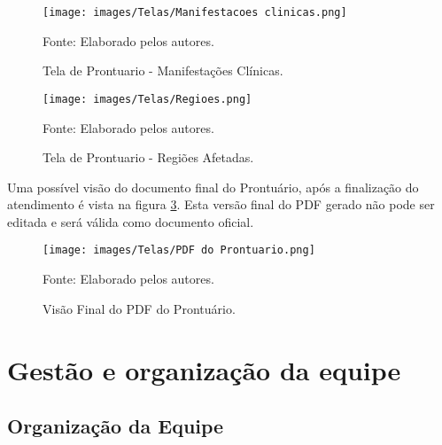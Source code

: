 \documentclass[
    12pt,               %
    openright,          %
    oneside,
    a4paper,            %
    BIBLATEX,           %
    TODO,               %
    english,            %
    brazil              %
    ]{ifsp-spo-inf-ctds}
\begin{document}
   \begin{figure}[H]
                \centering
                \caption{Tela de Prontuario - Manifestações Clínicas.}
                \texttt{[image: images/Telas/Manifestacoes clinicas.png]}
                
                \label{fig:Manifestacoes}
                \centering
        {\footnotesize Fonte: Elaborado pelos autores.}
            \end{figure}    

            \begin{figure}[H]
                \centering
                \caption{Tela de Prontuario - Regiões Afetadas.}
                \texttt{[image: images/Telas/Regioes.png]}
                
                \label{fig:Regioes}
                \centering
        {\footnotesize Fonte: Elaborado pelos autores.}
            \end{figure}    

Uma possível visão do documento final do Prontuário, após a finalização do atendimento é vista na figura \ref{fig:PdfProntuario}. Esta versão final do PDF gerado não pode ser editada e será válida como documento oficial.

    \begin{figure}[H]
                \centering
                \caption{Visão Final do PDF do Prontuário.}
                \texttt{[image: images/Telas/PDF do Prontuario.png]}
                
                \label{fig:PdfProntuario}
                \centering
        {\footnotesize Fonte: Elaborado pelos autores.}
            \end{figure}    

        











            
    
    

    \section{Gestão e organização da equipe}

        \subsection{Organização da Equipe}
            
\end{document}
